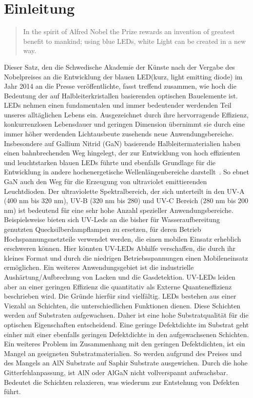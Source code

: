 
\chapter{Einleitung}
\thispagestyle{fancy}

\begin{quote}
In the spirit of Alfred Nobel the Prize rewards an invention of greatest benefit to mankind; using blue LEDs, white Light can be created in a new way.\end{quote}
Dieser Satz, den die Schwedische Akademie der Künste nach der Vergabe des Nobelpreises an die Entwicklung der blauen LED(kurz, light emitting diode) im Jahr 2014 an die Presse veröffentlichte, fasst treffend zusammen, wie hoch die Bedeutung der auf Halbleiterkristallen basierenden optischen Bauelemente ist.
LEDs nehmen einen fundamentalen und immer bedeutender werdenden Teil unseres alltäglichen Lebens ein. Ausgezeichnet durch ihre hervorragende Effizienz, konkurrenzlosen Lebensdauer und geringen Dimension übernimmt sie durch eine immer höher werdenden Lichtausbeute zusehends neue Anwendungsbereiche. 
Insbesondere auf Gallium Nitrid (GaN) basierende Halbleitermaterialien haben einen bahnbrechenden Weg hingelegt, der zur Entwicklung von hoch effizienten und leuchtstarken blauen LEDs führte und ebenfalls Grundlage für die Entwicklung in andere hochenergetische Wellenlängenbereiche darstellt~\cite{risk}.
So ebnet GaN auch den Weg für die Erzeugung von ultraviolet emittierenden Leuchtdioden. Der ultraviolette Spektralbereich, der sich unterteilt in den UV-A (400 nm bis 320 nm), UV-B (320 nm bis 280) und UV-C Bereich (280 nm bis 200 nm) ist bedeutend für eine sehr hohe Anzahl spezieller Anwendungsbereiche. Beispielsweise bieten sich UV-Leds an die bisher für Wasseraufbereitung genutzten Quecksilberdampflampen zu ersetzen, für deren Betrieb Hochspannungsnetzteile verwendet werden, die einen mobilen Einsatz erheblich erschweren können. Hier könnten UV-LEDs Abhilfe verschaffen, die durch ihr kleines Format und durch die niedrigen Betriebsspannungen einen Mobileneinsatz ermöglichen. Ein weiteres Anwendungsgebiet ist die industrielle Aushärtung/Aufbrechung von Lacken und die Gasdetektion. 
\newline
UV-LEDs leiden aber an einer geringen Effizienz die quantitativ als Externe Quanteneffizienz beschrieben wird. Die Gründe hierfür sind vielfältig. LEDs bestehen aus einer Viezahl an Schichten, die unterschiedlichen Funktionen dienen. Diese Schichten werden auf Substraten aufgewachsen. Daher ist eine hohe Substratqualität für die optischen Eigenschaften entscheidend. Eine geringe Defektdichte im Substrat geht einher mit einer ebenfalls geringen Defektdichte in den aufgewachsenen Schichten. Ein weiteres Problem im Zusammenhang mit den geringen Defektdichten, ist ein Mangel an geeigneten Substratmaterialien. So werden aufgrund des Preises und des Mangels an AlN Substrate auf Saphir Substrate ausgewichen. Durch die hohe Gitterfehlanpassung, ist AlN oder AlGaN nicht vollverspannt aufwachsbar. Bedeutet die Schichten relaxieren, was wiederum zur Entstehung von Defekten führt. 







